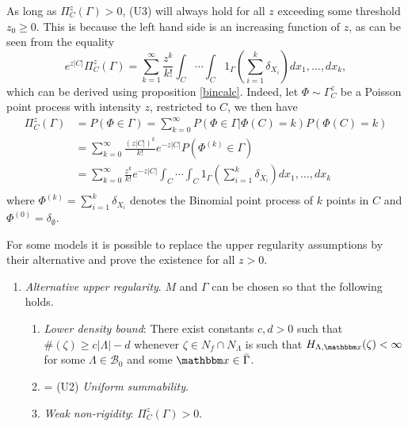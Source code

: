 As long as $\Pi^z_C (\Gamma) >0$, (U3) will always hold for all $z$ exceeding some threshold $z_0 \geq 0$. This is because the left hand side is an increasing function of $z$, as can be seen from the equality 
$$e^{z|C|} \Pi^z_C(\Gamma) = \sum^\infty_{k=1} \frac{z^k}{k!} \int_C \cdots \int_C 1_{\Gamma} \left(\sum^k_{i=1} \delta_{X_i}\right) dx_1, \dots, dx_k,$$
which can be derived using proposition \ref{bincalc}. Indeed, let $\Phi \sim \Gamma^z_C$ be a Poisson point process with intensity $z$, restricted to $C$, we then have
\begin{align*}
	\Pi^z_C(\Gamma) &= P(\Phi \in \Gamma) = \sum^\infty_{k=0} P(\Phi \in \Gamma | \Phi(C) = k) P(\Phi(C)=k) \\
	& = \sum^\infty_{k=0} \frac{(z|C|)^k}{k!} e^{-z|C|} P(\Phi^{(k)}\in \Gamma)\\ 
	& = \sum^\infty_{k=0} \frac{z^k}{k!} e^{-z|C|} \int_C \cdots \int_C 1_{\Gamma} \left(\sum^k_{i=1} \delta_{X_i}\right) dx_1, \dots, dx_k\\
\end{align*}
where $\Phi^{(k)} = \sum^k_{i=1}\delta_{X_i}$ denotes the Binomial point process of $k$ points in $C$ and $\Phi^{(0)} = \delta_\emptyset$.




For some models it is possible to replace the upper regularity assumptions by their alternative and prove the existence for all $z>0$.

\begin{enumerate}[(\textbf{\^{U}})]
	\item \textit{Alternative upper regularity}. $M$ and $\Gamma$ can be chosen so that the following holds.
	\begin{enumerate}[(\^U1)]
		\item \textit{Lower density bound}: There exist constants $c,d > 0$ such that $\#(\zeta) \geq c|\Lambda| - d$ whenever $\zeta \in N_f\cap N_\Lambda$ is such that $H_{\Lambda,\x}(\zeta)<\infty$ for some $\Lambda \in \mathcal B_0$ and some $\x \in \bar\Gamma$.
		\item = (U2) \textit{Uniform summability}.
		\item \textit{Weak non-rigidity}: $\Pi^z_C(\Gamma) > 0$.
	\end{enumerate}
\end{enumerate}






